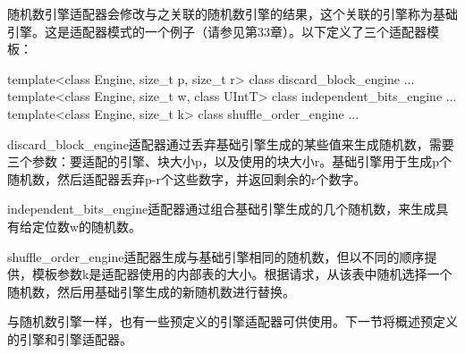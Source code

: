 随机数引擎适配器会修改与之关联的随机数引擎的结果，这个关联的引擎称为基础引擎。这是适配器模式的一个例子（请参见第33章）。以下定义了三个适配器模板：

\begin{cpp}
template<class Engine, size_t p, size_t r> class discard_block_engine {...}
template<class Engine, size_t w, class UIntT> class independent_bits_engine {...}
template<class Engine, size_t k> class shuffle_order_engine {...}
\end{cpp}

discard\_block\_engine适配器通过丢弃基础引擎生成的某些值来生成随机数，需要三个参数：要适配的引擎、块大小p，以及使用的块大小r。基础引擎用于生成p个随机数，然后适配器丢弃p-r个这些数字，并返回剩余的r个数字。

independent\_bits\_engine适配器通过组合基础引擎生成的几个随机数，来生成具有给定位数w的随机数。

shuffle\_order\_engine适配器生成与基础引擎相同的随机数，但以不同的顺序提供，模板参数k是适配器使用的内部表的大小。根据请求，从该表中随机选择一个随机数，然后用基础引擎生成的新随机数进行替换。

与随机数引擎一样，也有一些预定义的引擎适配器可供使用。下一节将概述预定义的引擎和引擎适配器。


























